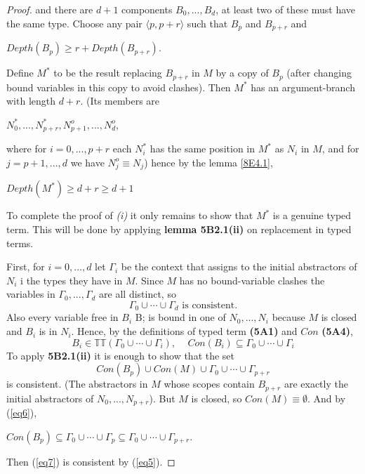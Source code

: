 \documentclass[a4paper,10pt]{article}
\begin{document}
\begin{lem}
\begin{proof}
and there are $d + 1$ components $B_0, ..., B_d$, at least two of these must have the same type. Choose any pair $\langle p, p + r\rangle$
such that $B_p$ and $B_{p + r}$ and
\begin{center}
 $Depth(B_p) \geq r + Depth(B_{p + r})$.
\end{center}
Define $M^*$ to be the result replacing $B_{p+r}$ in $M$ by a copy of $B_p$ (after changing bound variables in this copy to avoid clashes).
Then $M^*$ has an argument-branch with length $d + r$. (Its members are 
\begin{center}
 $N_0^*, ..., N^*_{p + r}, N^o_{p + 1}, ..., N^o_d$,
\end{center}
where for $i = 0, ..., p + r$ each $N_i^*$ has the same position in $M^*$ as $N_i$ in $M$, and for $j = p + 1, ..., d$ we have $N^o_j \equiv N_j$)
hence by the lemma \ref{8E4.1},
\begin{center}
 $Depth(M^*) \geq  d + r \geq d + 1$
\end{center}
To complete the proof of {\em (i)} it only remains to show that $M^*$ is a genuine typed
term. This will be done by applying \textbf{lemma 5B2.1(ii)} on replacement in typed terms.

First, for $i = 0, ..., d$ let $\Gamma_i$ be the context that assigns to the initial abstractors of
$N_i$ i the types they have in $M$. Since $M$ has no bound-variable clashes the variables
in $\Gamma_0, ..., \Gamma_d$ are all distinct, so
\begin{equation}\label{eq5}
 \Gamma_0 \cup \cdots \cup \Gamma_d \mbox{ is consistent}.
\end{equation}
Also every variable free in $B_i$ B; is bound in one of $N_0, ..., N_i$ because $M$ is closed and $B_i$ is in $N_i$.
Hence, by the definitions of typed term \textbf{(5A1)} and $Con$ \textbf{(5A4)},
\begin{equation}\label{eq6}
 B_i \in \mathbb{TT}(\Gamma_0 \cup \cdots \cup \Gamma_i), \,\,\,\,\,\,\, Con(B_i) \subseteq \Gamma_0 \cup \cdots \cup \Gamma_i
\end{equation}
To apply \textbf{5B2.1(ii)} it is enough to show that the set
\begin{equation}\label{eq7}
 Con(B_p)\cup Con(M)\cup\Gamma_0\cup \cdots \cup \Gamma_{p + r}
\end{equation}
is consistent. (The abstractors in $M$ whose scopes contain $B_{p + r}$  are exactly the initial
abstractors of $N_0, ..., N_{p + r}$). But $M$ is closed, so $Con(M) \equiv \emptyset$. And by (\ref{eq6}),
\begin{center}
 $Con(B_p) \subseteq \Gamma_0 \cup \cdots \cup \Gamma_p \subseteq \Gamma_0 \cup \cdots \cup \Gamma_{p + r}$.
\end{center}
Then (\ref{eq7}) is consistent by (\ref{eq5}).
\end{proof}
\end{lem}
\end{document}
